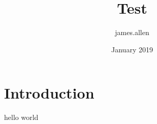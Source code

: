\documentclass{article}
\title{Test}
\author{james.allen }
\date{January 2019}
\begin{document}
\maketitle

\section{Introduction}

hello world
\end{document}

